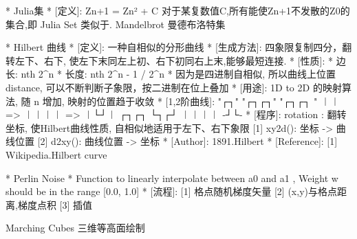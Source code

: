 \documentclass{article}
\begin{document}
*								Julia集
*	[定义]: Zn+1 = Zn² + C
			对于某复数值C,所有能使Zn+1不发散的Z0的集合,即 Julia Set
			类似于. Mandelbrot 曼德布洛特集


*								Hilbert 曲线
*	[定义]: 一种自相似的分形曲线
*	[生成方法]: 四象限复制四分，翻转左下、右下, 使左下末同左上初、右下初同右上末,能够最短连接.
*	[性质]:
		* 边长: nth 2^n
		* 长度: nth 2^n - 1 / 2^n
		* 因为是四进制自相似, 所以曲线上位置 distance, 可以不断判断子象限，按二进制在位上叠加
*	[用途]: 1D to 2D 的映射算法, 随 n 增加, 映射的位置趋于收敛
*	[1,2阶曲线]: "┌┐"	   "┌┐┌┐"    "┌┐┌┐ "
					︱︱  =>	︱︱︱︱ =>   ︱└┘︱
							┌┐┌┐      └┐┌┘
							︱︱︱︱       -┘└-
*	[程序]: rotation : 翻转坐标, 使Hilbert曲线性质, 自相似地适用于左下、右下象限
		[1] xy2d(): 坐标 -> 曲线位置    [2] d2xy(): 曲线位置 -> 坐标
*	[Author]: 1891.Hilbert
*	[Reference]: [1] Wikipedia.Hilbert curve


*								Perlin Noise
*	Function to linearly interpolate between a0 and a1 , Weight w should be in the range [0.0, 1.0]
*	[流程]:
		[1] 格点随机梯度矢量
		[2] (x,y)与格点距离,梯度点积
		[3] 插值

		

Marching Cubes 三维等高面绘制
\end{document}
